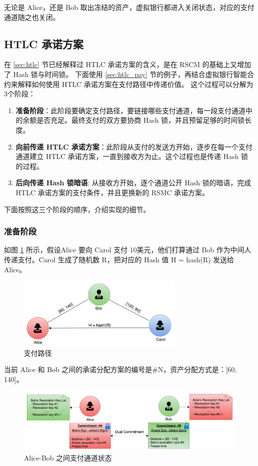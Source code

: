 \begin{appendices}
无论是 Alice，还是 Bob 取出冻结的资产，虚拟银行都进入关闭状态，对应的支付通道随之也关闭。

\subsection{HTLC 承诺方案}
在 \ref{sec:htlc} 节已经解释过 HTLC 承诺方案的含义，是在 RSCM 的基础上又增加了 Hash 锁与时间锁。
下面使用 \ref{sec:htlc_pay} 节的例子，再结合虚拟银行智能合约来解释如何使用 HTLC 承诺方案在支付路径中传递价值。
这个过程可以分解为3个阶段：
\begin{enumerate}
    \item \textbf{准备阶段}：此阶段要确定支付路径，要链接哪些支付通道，每一段支付通道中的余额是否充足。最终支付的双方要协商 Hash 锁，并且预留足够的时间锁长度。
    \item \textbf{向前传递 HTLC 承诺方案}：此阶段从支付的发送方开始，逐步在每一个支付通道建立 HTLC 承诺方案，一直到接收方为止。这个过程也是传递 Hash 锁的过程。
    \item \textbf{后向传递 Hash 锁暗语}: 从接收方开始，逐个通道公开 Hash 锁的暗语，完成 HTLC 承诺方案的支付条件，并且更换新的 RSMC 承诺方案。
\end{enumerate}

下面按照这三个阶段的顺序，介绍实现的细节。

\subsubsection{准备阶段}

如图 \ref{fig:A_channels} 所示，假设Alice 要向 Carol 支付 10美元，他们打算通过 Bob 作为中间人传递支付。Carol 生成了随机数 R，把对应的 Hash 值 H = hash(R) 发送给 Alice。

\begin{figure}[h!]
    \centering
    \includegraphics[width=8cm, keepaspectratio]{../images/channels.png}
    \caption{支付路径}
    \label{fig:A_channels}
\end{figure}


当前 Alice 和 Bob 之间的承诺分配方案的编号是\#N，资产分配方式是：[60, 140]。

\begin{figure}[h!]
    \centering
    \includegraphics[width=12cm, keepaspectratio]{../images/alice_bob_1.png}
    \caption{Alice-Bob 之间支付通道状态}
    \label{fig:A_alice_bob_1}
\end{figure}


\end{appendices}
